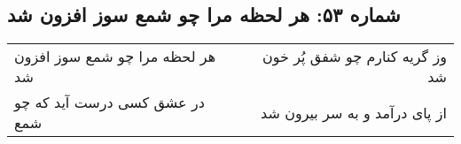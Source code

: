 \begin{center}
\section*{شماره ۵۳: هر لحظه مرا چو شمع سوز افزون شد}
\label{sec:053}
\begin{longtable}{l p{0.5cm} r}
هر لحظه مرا چو شمع سوز افزون شد
&&
وز گریه کنارم چو شفق پُر خون شد
\\
در عشق کسی درست آید که چو شمع
&&
از پای درآمد و به سر بیرون شد
\\
\end{longtable}
\end{center}
